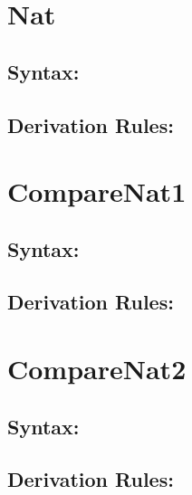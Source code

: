 \documentclass[11pt]{jarticle}
\begin{document}
\section*{Nat}



\subsection*{Syntax:}

\NatDisplayBNF

\subsection*{Derivation Rules:}
\NatDisplayRules

\newpage

\section*{CompareNat1}



\subsection*{Syntax:}

\CompareNatiDisplayBNF

\subsection*{Derivation Rules:}
\CompareNatiDisplayRules

\newpage

\section*{CompareNat2}



\subsection*{Syntax:}

\CompareNatiiDisplayBNF

\subsection*{Derivation Rules:}
\CompareNatiiDisplayRules
\end{document}
